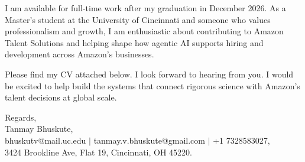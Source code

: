 \documentclass[11pt]{letter}
\begin{document}
\begin{letter}{}
I am available for full-time work after my graduation in December 2026. As a Master's student at the University of Cincinnati and someone who values professionalism and growth, I am enthusiastic about contributing to Amazon Talent Solutions and helping shape how agentic AI supports hiring and development across Amazon's businesses.

Please find my CV attached below. I look forward to hearing from you. I would be excited to help build the systems that connect rigorous science with Amazon's talent decisions at global scale.

{\setlength{\parskip}{0pt}
Regards,\\
Tanmay Bhuskute,\\
bhuskutv@mail.uc.edu $\mid$ tanmay.v.bhuskute@gmail.com $\mid$ +1 7328583027,\\
3424 Brookline Ave, Flat 19, Cincinnati, OH 45220.
}

\end{letter}
\end{document}
